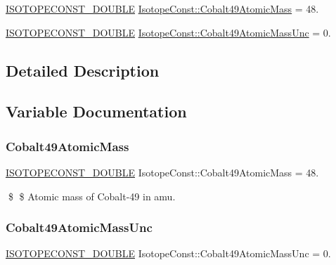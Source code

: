 \begin{DoxyCompactItemize}
\item 
\mbox{\hyperlink{group___isotope_const-_macros_ga8f45a7272ce02c0b4c65c44636ed719a}{I\+S\+O\+T\+O\+P\+E\+C\+O\+N\+S\+T\+\_\+\+D\+O\+U\+B\+LE}} \mbox{\hyperlink{group___isotope_const-_cobalt-_co49_ga600f86e2ffe7c19504aecef131914d7c}{Isotope\+Const\+::\+Cobalt49\+Atomic\+Mass}} = 48.
\item 
\mbox{\hyperlink{group___isotope_const-_macros_ga8f45a7272ce02c0b4c65c44636ed719a}{I\+S\+O\+T\+O\+P\+E\+C\+O\+N\+S\+T\+\_\+\+D\+O\+U\+B\+LE}} \mbox{\hyperlink{group___isotope_const-_cobalt-_co49_ga54597d6ea0de7903a5281e18b1ecd701}{Isotope\+Const\+::\+Cobalt49\+Atomic\+Mass\+Unc}} = 0.
\end{DoxyCompactItemize}


\subsection{Detailed Description}


\subsection{Variable Documentation}
\mbox{\label{group___isotope_const-_cobalt-_co49_ga600f86e2ffe7c19504aecef131914d7c}} 
\subsubsection{\texorpdfstring{Cobalt49\+Atomic\+Mass}{Cobalt49AtomicMass}}
{\footnotesize\ttfamily \mbox{\hyperlink{group___isotope_const-_macros_ga8f45a7272ce02c0b4c65c44636ed719a}{I\+S\+O\+T\+O\+P\+E\+C\+O\+N\+S\+T\+\_\+\+D\+O\+U\+B\+LE}} Isotope\+Const\+::\+Cobalt49\+Atomic\+Mass = 48.}

\$ \$ Atomic mass of Cobalt-\/49 in amu. \mbox{\label{group___isotope_const-_cobalt-_co49_ga54597d6ea0de7903a5281e18b1ecd701}} 
\subsubsection{\texorpdfstring{Cobalt49\+Atomic\+Mass\+Unc}{Cobalt49AtomicMassUnc}}
{\footnotesize\ttfamily \mbox{\hyperlink{group___isotope_const-_macros_ga8f45a7272ce02c0b4c65c44636ed719a}{I\+S\+O\+T\+O\+P\+E\+C\+O\+N\+S\+T\+\_\+\+D\+O\+U\+B\+LE}} Isotope\+Const\+::\+Cobalt49\+Atomic\+Mass\+Unc = 0.}

